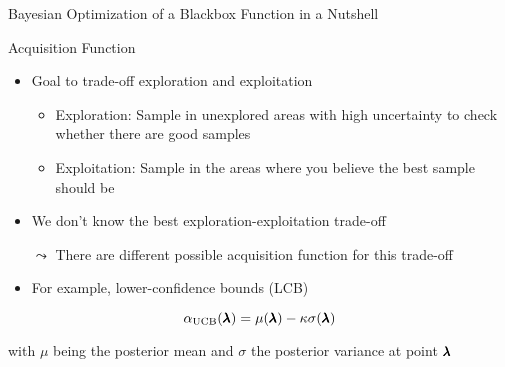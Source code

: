 \documentclass[aspectratio=169]{../latex_main/tntbeamer}  %
\begin{document}
\begin{frame}[c]{Bayesian Optimization of a Blackbox Function in a Nutshell}

\bigskip
\bigskip
\bigskip

    \begin{figure}
        \vspace{-1em}
        \centering
    \end{figure}
    
\end{frame}
\begin{frame}[c]{Acquisition Function}

\begin{itemize}
    \item Goal to trade-off exploration and exploitation
    \begin{itemize}
        \item \alert{Exploration:} Sample in unexplored areas with high uncertainty to check\\ whether there are good samples
        \item \alert{Exploitation:} Sample in the areas where you believe the best sample should be
    \end{itemize}
    \smallskip
    \item We don't know the best exploration-exploitation trade-off
    \item[$\leadsto$] There are different possible acquisition function for this trade-off
    \smallskip
    \item For example, lower-confidence bounds (LCB)
\end{itemize}

\begin{equation}
    \alpha_{\text{UCB}}(\pmb{\lambda}) = \mu(\pmb{\lambda}) - \kappa \sigma(\pmb{\lambda})
\end{equation}

with $\mu$ being the posterior mean and $\sigma$ the posterior variance at point $\pmb{\lambda}$

\end{frame}
\end{document}
